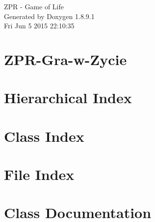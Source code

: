 \documentclass[twoside]{book}
\newcommand{\+}{\discretionary{\mbox{\scriptsize$\hookleftarrow$}}{}{}}
\newcommand{\clearemptydoublepage}{%
  \newpage{\pagestyle{empty}\cleardoublepage}%
}
\begin{document}
\hypersetup{pageanchor=false,
             bookmarks=true,
             bookmarksnumbered=true,
             pdfencoding=unicode
            }
\begin{titlepage}
\vspace*{7cm}
\begin{center}%
{\Large Z\+P\+R -\/ Game of Life }\\
\vspace*{1cm}
{\large Generated by Doxygen 1.8.9.1}\\
\vspace*{0.5cm}
{\small Fri Jun 5 2015 22:10:35}\\
\end{center}
\end{titlepage}
\clearemptydoublepage
\tableofcontents
\clearemptydoublepage
{}
\hypersetup{pageanchor=true}

\chapter{Z\+P\+R-\/\+Gra-\/w-\/\+Zycie}
\label{md__r_e_a_d_m_e}
\hypertarget{md__r_e_a_d_m_e}{}

\chapter{Hierarchical Index}

\chapter{Class Index}

\chapter{File Index}

\chapter{Class Documentation}













































\end{document}
